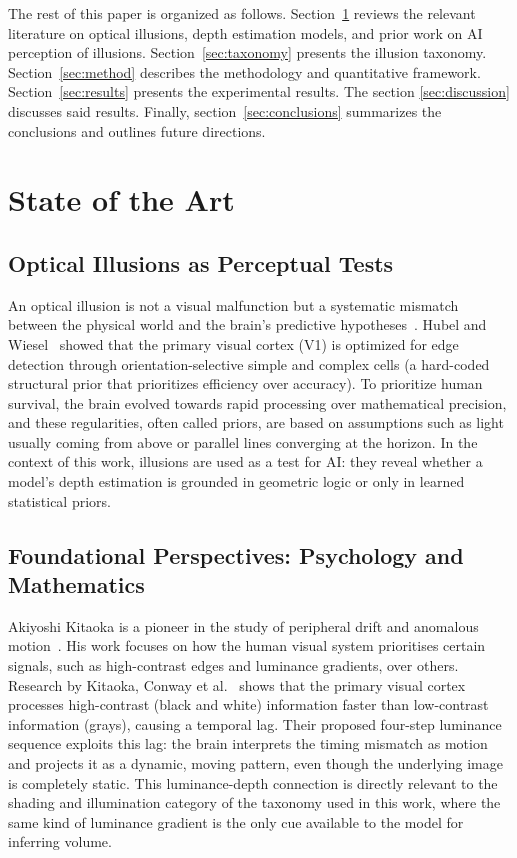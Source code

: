 \documentclass[10pt,twocolumn]{article}
\begin{document}
The rest of this paper is organized as follows. Section~\ref{sec:sota} reviews the relevant
literature on optical illusions, depth estimation models, and prior work on AI perception of
illusions. Section~\ref{sec:taxonomy} presents the illusion taxonomy. Section~\ref{sec:method}
describes the methodology and quantitative framework. Section~\ref{sec:results} presents the experimental results. The section \ref{sec:discussion} discusses said results. Finally, section~\ref{sec:conclusions} summarizes the
conclusions and outlines future directions.

\section{State of the Art}
\label{sec:sota}

\subsection{Optical Illusions as Perceptual Tests}

An optical illusion is not a visual malfunction but a systematic mismatch between the
physical world and the brain's predictive hypotheses~\cite{gregory1997}. Hubel and
Wiesel~\cite{hubel1962} showed that the primary visual cortex (V1) is optimized for edge
detection through orientation-selective simple and complex cells (a hard-coded structural
prior that prioritizes efficiency over accuracy). To prioritize human survival, the brain
evolved towards rapid processing over mathematical precision, and these regularities,
often called priors, are based on assumptions such as light usually coming from above or
parallel lines converging at the horizon. In the context of this work, illusions are used
as a test for AI: they reveal whether a model's depth estimation is grounded in geometric
logic or only in learned statistical priors.

\subsection{Foundational Perspectives: Psychology and Mathematics}

Akiyoshi Kitaoka is a pioneer in the study of peripheral drift and anomalous
motion~\cite{kitaoka2005}. His work focuses on how the human visual system prioritises
certain signals, such as high-contrast edges and luminance gradients, over others.
Research by Kitaoka, Conway et al.~\cite{conway2005} shows that the primary visual
cortex processes high-contrast (black and white) information faster than low-contrast
information (grays), causing a temporal lag. Their proposed four-step luminance
sequence exploits this lag: the brain interprets the timing mismatch as motion and
projects it as a dynamic, moving pattern, even though the underlying image is completely
static. This luminance-depth connection is directly relevant to the shading and
illumination category of the taxonomy used in this work, where the same kind of
luminance gradient is the only cue available to the model for inferring volume.
\end{document}
